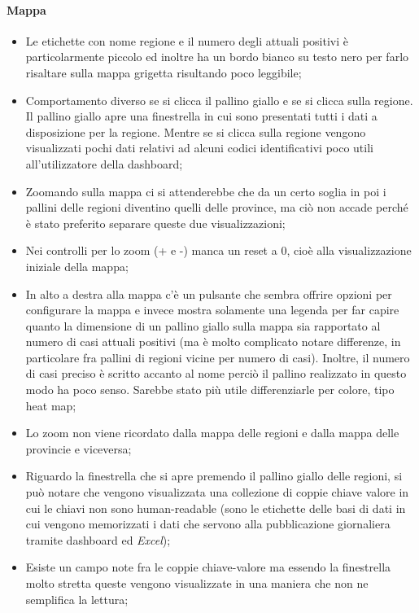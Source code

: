 \paragraph{Mappa}
\begin{itemize}
    \item Le etichette con nome regione e il numero degli attuali positivi è particolarmente piccolo ed inoltre ha un bordo bianco su testo nero per farlo risaltare sulla mappa grigetta risultando poco leggibile;
    \item Comportamento diverso se si clicca il pallino giallo e se si clicca sulla regione. Il pallino giallo apre una finestrella in cui sono presentati tutti i dati a disposizione per la regione. Mentre se si clicca sulla regione vengono visualizzati pochi dati relativi ad alcuni codici identificativi poco utili all'utilizzatore della dashboard;
    \item Zoomando sulla mappa ci si attenderebbe che da un certo soglia in poi i pallini delle regioni diventino quelli delle province, ma ciò non accade perché è stato preferito separare queste due visualizzazioni;
    \item Nei controlli per lo zoom (+ e -) manca un reset a 0, cioè alla visualizzazione iniziale della mappa;
    \item In alto a destra alla mappa c'è un pulsante che sembra offrire opzioni per configurare la mappa e invece mostra solamente una legenda per far capire quanto la dimensione di un pallino giallo sulla mappa sia rapportato al numero di casi attuali positivi (ma è molto complicato notare differenze, in particolare fra pallini di regioni vicine per numero di casi). Inoltre, il numero di casi preciso è scritto accanto al nome perciò il pallino realizzato in questo modo ha poco senso. Sarebbe stato più utile differenziarle per colore, tipo heat map;
    \item Lo zoom non viene ricordato dalla mappa delle regioni e dalla mappa delle provincie e viceversa;
    \item Riguardo la finestrella che si apre premendo il pallino giallo delle regioni, si può notare che vengono visualizzata una collezione di coppie chiave valore in cui le chiavi non sono human-readable (sono le etichette delle basi di dati in cui vengono memorizzati i dati che servono alla pubblicazione giornaliera tramite dashboard ed \textit{Excel});
    \item Esiste un campo note fra le coppie chiave-valore ma essendo la finestrella molto stretta queste vengono visualizzate in una maniera che non ne semplifica la lettura;

\end{itemize}
